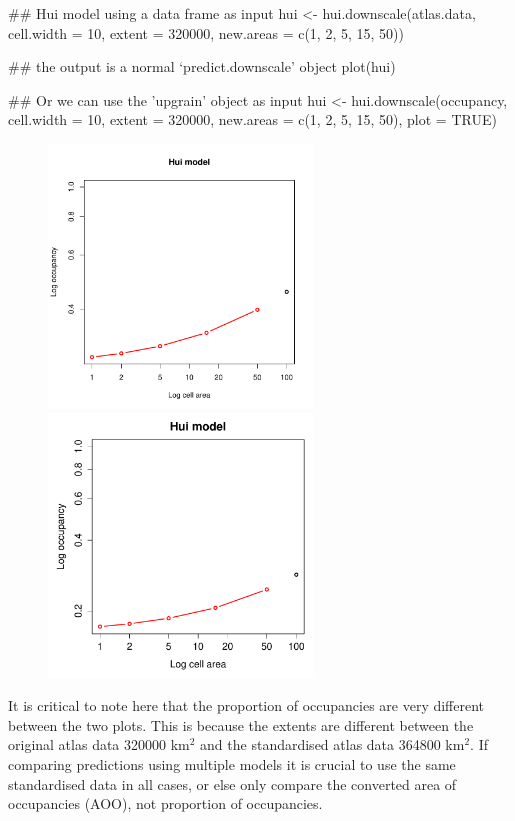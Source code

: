 \documentclass{article}[12pt, a4paper]
\begin{document}
\begin{Schunk}
\begin{Sinput}
## Hui model using a data frame as input
hui <- hui.downscale(atlas.data,
                     cell.width = 10,
                     extent = 320000,
                     new.areas = c(1, 2, 5, 15, 50))

## the output is a normal ‘predict.downscale’ object	
plot(hui)

## Or we can use the 'upgrain' object as input
hui <- hui.downscale(occupancy,
                     cell.width = 10,
                     extent = 320000,
                     new.areas = c(1, 2, 5, 15, 50),
                     plot = TRUE)
\end{Sinput}
\end{Schunk}
\begin{figure}[!ht]
\centering
\includegraphics[width=7cm]{Downscaling-downscale18}
\includegraphics[width=7cm]{Downscaling-downscale19}
\end{figure}

It is critical to note here that the proportion of occupancies are very different between the two plots. This is because the extents are different between the original atlas data 320000 km$^2$ and the standardised atlas data 364800 km$^2$. If comparing predictions using multiple models it is crucial to use the same standardised data in all cases, or else only compare the converted area of occupancies (AOO), not proportion of occupancies.
\end{document}

